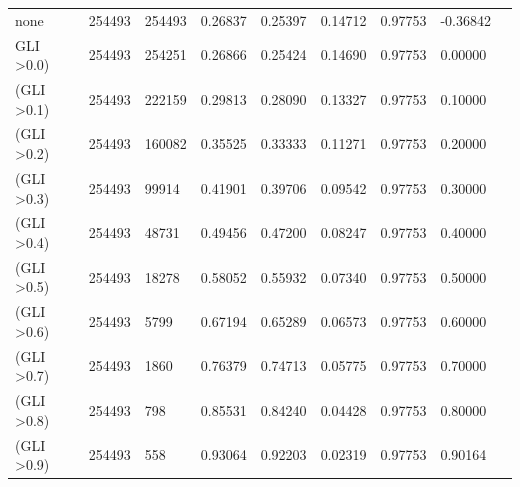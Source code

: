 \documentclass[drones,technicalnote,accept,pdftex,moreauthors]{Definitions/mdpi}
\begin{document}
\begin{table}[H]
\begin{tabular}{lllllllll}
none                   & 254493          & 254493                            & 0.26837            & 0.25397              & 0.14712           & 0.97753           & -0.36842          \\
GLI \textgreater 0.0) & 254493          & 254251                            & 0.26866            & 0.25424              & 0.14690           & 0.97753           & 0.00000           \\
(GLI \textgreater 0.1) & 254493          & 222159                            & 0.29813            & 0.28090              & 0.13327           & 0.97753           & 0.10000           \\
(GLI \textgreater 0.2) & 254493          & 160082                            & 0.35525            & 0.33333              & 0.11271           & 0.97753           & 0.20000           \\
(GLI \textgreater 0.3) & 254493          & 99914                             & 0.41901            & 0.39706              & 0.09542           & 0.97753           & 0.30000           \\
(GLI \textgreater 0.4) & 254493          & 48731                             & 0.49456            & 0.47200              & 0.08247           & 0.97753           & 0.40000           \\
(GLI \textgreater 0.5) & 254493          & 18278                             & 0.58052            & 0.55932              & 0.07340           & 0.97753           & 0.50000           \\
(GLI \textgreater 0.6) & 254493          & 5799                              & 0.67194            & 0.65289              & 0.06573           & 0.97753           & 0.60000           \\
(GLI \textgreater 0.7) & 254493          & 1860                              & 0.76379            & 0.74713              & 0.05775           & 0.97753           & 0.70000           \\
(GLI \textgreater 0.8) & 254493          & 798                               & 0.85531            & 0.84240              & 0.04428           & 0.97753           & 0.80000           \\
(GLI \textgreater 0.9) & 254493          & 558                               & 0.93064            & 0.92203              & 0.02319           & 0.97753           & 0.90164\\

\hline
\end{tabular}

\end{table}
\end{document}
